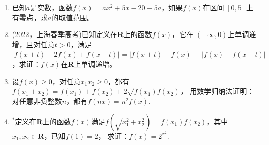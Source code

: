 \begin{enumerate}[label={\textbf{\arabic*.}},leftmargin=
    \inteval{\myenumleftmargin}pt]
\item 已知$ a $是实数，函数$ f(x)=ax^2+5x−20-5a $，如果$ f(x) $在区间
$ [0,5] $上有零点，求$ a $的取值范围。

\item (2022，上海春季高考)已知定义在\textbf{R}上的函数$ f(x) $，它在
$ (-\infty,0) $上单调递增，且对任意$ t>0 $，满足$ |f(x+t)-2f(x)+f(x-t)|
=|f(x+t)-f(x)|-|f(x)-f(x-t)| $，求证：$ f(x) $在\textbf{R}上单调递增。 

\item 设$ f(x)\geq 0 $，对任意$ x_1x_2\geq 0 $，都有
$ f(x_1+x_2)=f(x_1)+f(x_2)+2\sqrt{f(x_1)f(x_2)} $，
用数学归纳法证明：对任意非负整数$ n $，都有$ f(nx)=n^2f(x) $.

\item $ ^* $定义在\textbf{R}上的函数$ f(x) $满足$ f(\sqrt{x_1^2+x_2^2})= 
f(x_1)f(x_2) $，其中$ x_1,x_2\in \textbf{R} $，已知$ f(1)=2 $，
求证：$ f(x)=2^{x^2} $.

\end{enumerate}

